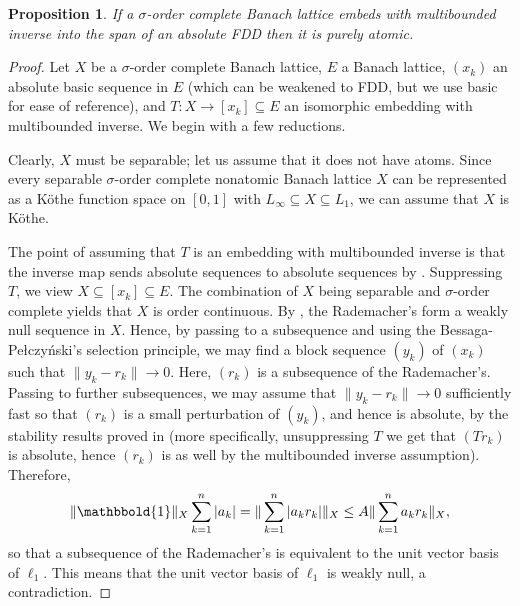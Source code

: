 \documentclass[12pt,leqno]{amsart}
\newtheorem{proposition}[theorem]{Proposition}
\numberwithin{equation}{section}
\theoremstyle{definition}
\def\one{\mathbbold{1}}
\begin{document}
\begin{proposition}\label{no measurable functions}
If a $\sigma$-order complete Banach lattice embeds with multibounded inverse into the span of an absolute FDD then it is purely atomic.
\end{proposition}
\begin{proof}
Let $X$ be a $\sigma$-order complete Banach lattice, $E$ a Banach lattice, $(x_k)$ an absolute basic sequence in $E$ (which can be weakened to FDD, but we use basic for ease of reference), and $T:X\to [x_k]\subseteq E$ an isomorphic embedding with multibounded  inverse. We begin with a few reductions.
\medskip

Clearly, $X$ must be separable; let us assume that it does not have atoms. Since every separable $\sigma$-order complete nonatomic Banach lattice $X$ can be represented as a K\"othe function space on $[0,1]$ with $L_\infty \subseteq X \subseteq L_1$, we can assume that $X$ is K\"othe. 
\medskip



The point of assuming that $T$ is an embedding with multibounded inverse is that the inverse map sends absolute sequences to absolute sequences by . Suppressing $T$, we view $X\subseteq [x_k]\subseteq E$. The combination of $X$ being separable and $\sigma$-order complete yields that $X$ is order continuous. By \cite[Corollary 3.1.25]{Lin}, the Rademacher's form a weakly null sequence in $X$. Hence, by passing to a subsequence and using the Bessaga-Pe{\l}\-czy{\'n}\-ski's selection principle, we may find a block sequence $(y_k)$ of $(x_k)$ such that $\|y_k-r_k\|\rightarrow 0$. Here, $(r_k)$ is a subsequence of the Rademacher's. Passing to further subsequences, we may assume that $\|y_k-r_k\|\rightarrow 0$ sufficiently fast so that $(r_k)$ is a small perturbation of $(y_k)$, and hence is absolute, by the stability results proved in \cite{TT19} (more specifically, unsuppressing $T$ we get that $(Tr_k)$ is absolute, hence $(r_k)$ is as well by the multibounded inverse assumption). Therefore, 
$$\|\one\|_X\sum_{k=1}^n |a_k| = \|\sum_{k=1}^n |a_kr_k|\|_X\leq A \|\sum_{k=1}^n a_kr_k\|_X,$$ so that a subsequence of the Rademacher's is equivalent to the unit vector basis of $\ell_1$. This means that the unit vector basis of $\ell_1$ is weakly null, a contradiction. 
\medskip


\end{proof}
\end{document}

